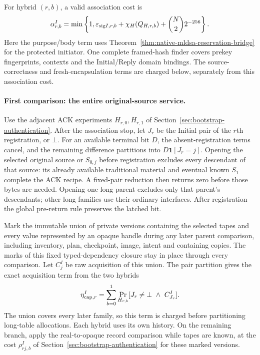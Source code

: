 \documentclass[pdflatex]{sn-jnl}
\theoremstyle{thmstyleone}
\theoremstyle{thmstylethree}
\theoremstyle{thmstyletwo}
\begin{document}
For hybrid $(r,b)$, a valid association cost is
\[
 \alpha^{I}_{r,b}=\min\left\{1,
   \varepsilon_{{\rm sig}I,r,b}+\chi_H(Q_{H,r,b})
       +\binom N2 2^{-256}\right\}.
\]
Here the purpose/body term uses
Theorem~\ref{thm:native-mldsa-reservation-bridge} for the protected
initiator. One complete framed-hash finder covers prekey fingerprints,
contexts and the Initial/Reply domain bindings. The source-correctness
and fresh-encapsulation terms are charged below, separately from this
association cost.

\paragraph{First comparison: the entire original-source service.}
Use the adjacent ACK experiments $H_{r,0},H_{r,1}$ of
Section~\ref{sec:bootstrap-authentication}. After the association stop,
let $J_r$ be the Initial pair of the $r$th registration, or $\bot$.
For an available terminal bit $D$, the absent-registration terms cancel,
and the remaining difference partitions into
$D\mathbf1[J_r=j]$. Opening the selected original source or $S_{0,j}$
before registration excludes every descendant of that source: its
already available traditional material and eventual known $S_1$ complete
the ACK recipe. A fixed-pair reduction then returns zero before those
bytes are needed. Opening one long parent excludes only that parent's
descendants; other long families use their ordinary interfaces.
After registration the global pre-return rule preserves the latched bit.

Mark the immutable union of private versions containing the selected
tapes and every value represented by an opaque handle during any later
parent comparison, including inventory, plan, checkpoint, image, intent
and containing copies. The marks of this fixed typed-dependency closure
stay in place through every comparison. Let $C_j^I$ be raw acquisition of this union.
The pair partition gives the exact acquisition term from the two hybrids
\begin{equation}
 \eta^I_{{\rm cap},r}
   =\sum_{b=0}^{1}\Pr_{H_{r,b}}
          [J_r\ne\bot\ \land\ C^I_{J_r}].
 \label{eq:bootstrap-initial-capture}
\end{equation}
The union covers every later family, so this term is charged before
partitioning long-table allocations. Each hybrid uses its own history.
On the remaining branch, apply the real-to-opaque record comparison
while tapes are known, at the cost $\rho^I_{rj,b}$ of
Section~\ref{sec:bootstrap-authentication} for these marked versions.
\end{document}
